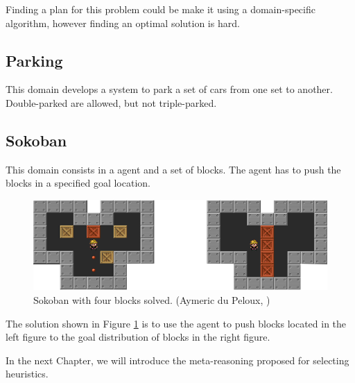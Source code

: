 Finding a plan for this problem could be make it using a domain-specific algorithm, however finding an optimal solution is hard.

\subsection{Parking}
This domain develops a system to park a set of cars from one set to another. Double-parked are allowed, but not triple-parked.

\subsection{Sokoban}
This domain consists in a agent and a set of blocks. The agent has to push the blocks in a specified goal location. 

\begin{figure}[!htb]
\begin{center}
  \includegraphics[width=12cm,scale=0.5]{images/sokoban_star_end}
\end{center}
\caption{Sokoban with four blocks solved. (Aymeric du Peloux, \citeyear{sokoban2010})}\label{fig:img_sokoban_solved}
\end{figure}

The solution shown in Figure \ref{fig:img_sokoban_solved} is to use the agent to push blocks located in the left figure to the goal distribution of blocks in the right figure.
\fi

\bigskip

In the next Chapter, we will introduce the meta-reasoning proposed for selecting heuristics.

\clearpage